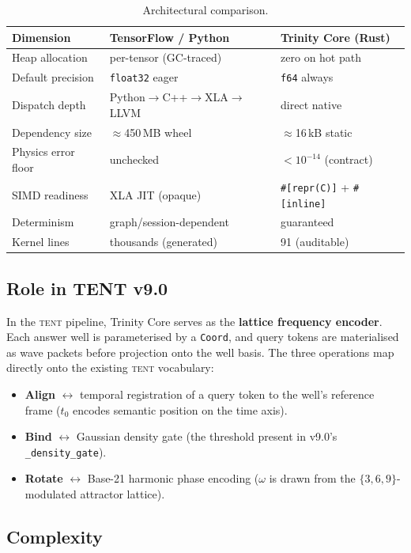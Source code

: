 \documentclass[11pt,a4paper]{article}
\theoremstyle{definition}
\newcommand{\TENT}{\textsc{tent}}
\newcommand{\CB}[1]{\texttt{#1}}
\begin{document}
\begin{table}[h]
\centering
\caption{Architectural comparison.}
\label{tab:comparison}
\begin{tabular}{lll}
\toprule
Dimension & TensorFlow / Python & Trinity Core (Rust) \\
\midrule
Heap allocation & per-tensor (GC-traced) & zero on hot path \\
Default precision & \CB{float32} eager & \CB{f64} always \\
Dispatch depth & Python$\to$C++$\to$XLA$\to$LLVM & direct native \\
Dependency size & $\approx$450\,MB wheel & $\approx$16\,kB static \\
Physics error floor & unchecked & $< 10^{-14}$ (contract) \\
SIMD readiness & XLA JIT (opaque) & \CB{\#[repr(C)]} + \CB{\#[inline]} \\
Determinism & graph/session-dependent & guaranteed \\
Kernel lines & thousands (generated) & 91 (auditable) \\
\bottomrule
\end{tabular}
\end{table}

\subsection{Role in TENT v9.0}

In the \TENT{} pipeline, Trinity Core serves as the
\textbf{lattice frequency encoder}.  Each answer well is parameterised
by a \CB{Coord}, and query tokens are materialised as wave packets
before projection onto the well basis.  The three operations map
directly onto the existing \TENT{} vocabulary:

\begin{itemize}
  \item \textbf{Align} $\leftrightarrow$ temporal registration of a
        query token to the well's reference frame ($t_0$ encodes
        semantic position on the time axis).
  \item \textbf{Bind} $\leftrightarrow$ Gaussian density gate
        (the threshold present in v9.0's \CB{\_density\_gate}).
  \item \textbf{Rotate} $\leftrightarrow$ Base-21 harmonic phase
        encoding ($\omega$ is drawn from the
        $\{3,6,9\}$-modulated attractor lattice).
\end{itemize}

\subsection{Complexity}
\end{document}
